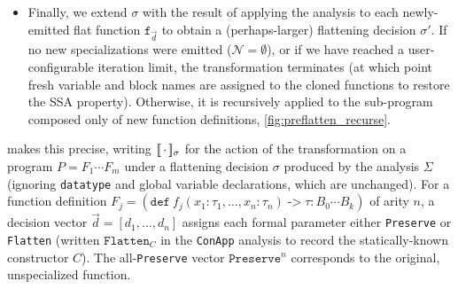 \begin{itemize}



\item
Finally, we extend $\sigma$ with the result of applying the analysis to each
newly-emitted flat function $\texttt{f}_{\vec{d}}$ to obtain a (perhaps-larger)
flattening decision $\sigma'$. If no new specializations were emitted
($\mathcal{N} = \emptyset$), or if we have reached a user-configurable
iteration limit, the transformation terminates (at which point fresh variable
and block names are assigned to the cloned functions to restore the SSA
property). Otherwise, it is recursively applied to the sub-program composed
only of new function definitions, \cref{fig:preflatten_recurse}.

\end{itemize}


 makes this precise, writing
$[\![\, \cdot \,]\!]_{\sigma}$ for the action of the transformation on a program $P =
F_1 \cdots F_m$ under a flattening decision $\sigma$ produced by the analysis
$\Sigma$ (ignoring \texttt{datatype} and global variable declarations, which are
unchanged). For a function definition $F_j = (\mathtt{def}\
f_j(x_1{:}\tau_1, \dots, x_n{:}\tau_n) \mathrel{\texttt{->}} \tau : B_0 \cdots B_k)$ of arity
$n$, a decision vector $\vec{d} = [d_1, \dots, d_n]$ assigns each formal
parameter either \texttt{Preserve} or \texttt{Flatten} (written
$\texttt{Flatten}_C$ in the \texttt{ConApp} analysis to record the
statically-known constructor $C$). The all-\texttt{Preserve} vector
$\texttt{Preserve}^n$ corresponds to the original, unspecialized function.

